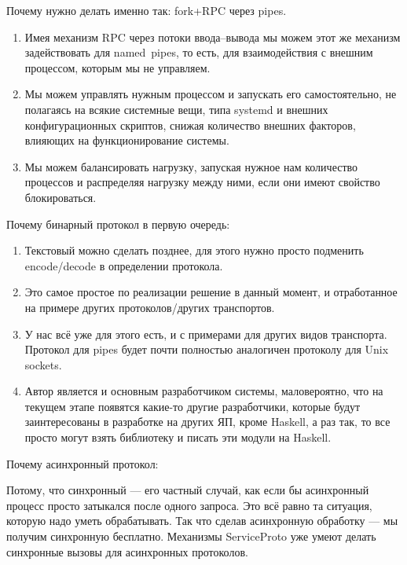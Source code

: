 Почему нужно делать именно так: fork+RPC через pipes.

\begin{enumerate}
  \item Имея механизм RPC через потоки ввода--вывода мы можем этот же
  механизм задействовать для named~pipes, то есть, для взаимодействия
  с внешним процессом, которым мы не управляем.
  \item Мы можем управлять нужным процессом и запускать его
  самостоятельно, не полагаясь на всякие системные вещи, типа systemd
  и внешних конфигурационных скриптов, снижая количество внешних
  факторов, влияющих на функционирование системы.
  \item Мы можем балансировать нагрузку, запуская нужное нам
  количество процессов и распределяя нагрузку между ними, если они
  имеют свойство блокироваться.
\end{enumerate}

Почему бинарный протокол в первую очередь:

\begin{enumerate}
  \item Текстовый можно сделать позднее, для этого нужно просто
  подменить encode/decode в определении протокола.
  \item Это самое простое по реализации решение в данный момент, и
  отработанное на примере других протоколов/других транспортов.
  \item У нас всё уже для этого есть, и с примерами для других видов
  транспорта. Протокол для pipes будет почти полностью аналогичен
  протоколу для Unix sockets.
  \item Автор является и основным разработчиком системы, маловероятно,
  что на текущем этапе появятся какие-то другие разработчики, которые
  будут заинтересованы в разработке на других ЯП, кроме Haskell, а раз
  так, то все просто могут взять библиотеку и писать эти модули на
  Haskell.
\end{enumerate}

Почему асинхронный протокол:

Потому, что синхронный --- его частный случай, как если бы асинхронный
процесс просто затыкался после одного запроса. Это всё равно та
ситуация, которую надо уметь обрабатывать. Так что сделав асинхронную
обработку --- мы получим синхронную бесплатно. Механизмы ServiceProto
уже умеют делать синхронные вызовы для асинхронных протоколов.






